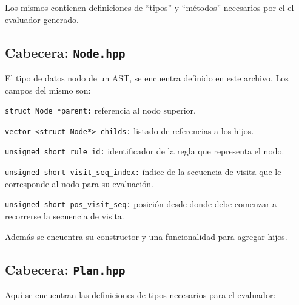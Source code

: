 Los mismos contienen definiciones de ``tipos'' y ``métodos'' necesarios por el el evaluador generado.

\subsection{Cabecera: \texttt{Node.hpp}}

El tipo de datos nodo de un AST, se encuentra definido en este archivo. Los campos del mismo son:
\begin{items}
\item \texttt{struct Node *parent:} referencia al nodo superior.

\item \texttt{vector <struct Node*>\ childs:} listado de referencias a los hijos.

\item \texttt{unsigned short rule\_id:} identificador de la regla que representa el nodo.

\item \texttt{unsigned short visit\_seq\_index:} índice de la secuencia de visita que le corresponde al nodo para su evaluación.

\item \texttt{unsigned short pos\_visit\_seq:} posición desde donde debe comenzar a recorrerse la secuencia de visita.
\end{items}

Además se encuentra su constructor y una funcionalidad para agregar hijos.

\subsection{Cabecera: \texttt{Plan.hpp}}

Aquí se encuentran las definiciones de tipos necesarios para el evaluador:

